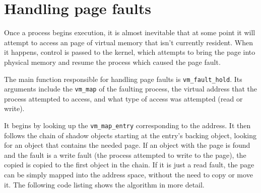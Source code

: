 \documentclass[shortabstract, english]{iithesis}
\begin{document}
\section{Handling page faults}

Once a process begins execution, it is almost inevitable that at some point it
will attempt to access an page of virtual memory that isn't currently resident.
When it happens, control is passed to the kernel, which attempts to bring the
page into physical memory and resume the process which caused the page fault.

The main function responsible for handling page faults is
\texttt{vm_fault_hold}. Its arguments include the \texttt{vm_map}
of the faulting process, the virtual address that the process attempted to
access, and what type of access was attempted (read or write).

It begins by looking up the \texttt{vm_map_entry} corresponding to the
address. It then follows the chain of shadow objects starting at the entry's
backing object, looking for an object that contains the needed page. If an
object with the page is found and the fault is a write fault (the process
attempted to write to the page), the copied is copied to the first object in the
chain. If it is just a read fault, the page can be simply mapped into the
address space, without the need to copy or move it. The following code listing
shows the algorithm in more detail.
\end{document}
